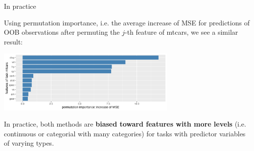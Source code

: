 \documentclass[11pt,compress,t,notes=noshow, xcolor=table]{beamer}
\begin{document}
\begin{vbframe}{In practice}

{\small
Using permutation importance, i.e. the average increase of MSE for predictions of OOB observations after permuting the $j$-th feature of mtcars, we see a similar result:
}

\begin{center}
\includegraphics[width=0.66\textwidth]{figure/forest-fimp_perm.png}
\end{center}

{\small
In practice, both methods are \textbf{biased toward features with more levels} (i.e. continuous or categorial with many categories) for tasks with predictor variables of varying types. 
}

\end{vbframe}

\endlecture
\end{document}
